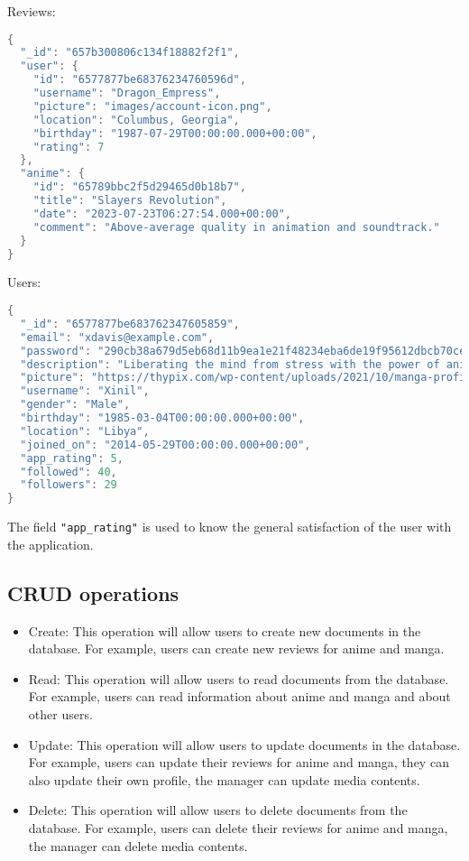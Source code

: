 \newpage
Reviews:
\begin{mdframed}[backgroundcolor=yellow!20, innerleftmargin=10pt, innerrightmargin=10pt]
    \begin{lstlisting}[language=java]
{
  "_id": "657b300806c134f18882f2f1",
  "user": {
    "id": "6577877be68376234760596d",
    "username": "Dragon_Empress",
    "picture": "images/account-icon.png",
    "location": "Columbus, Georgia",
    "birthday": "1987-07-29T00:00:00.000+00:00",
    "rating": 7
  },
  "anime": {
    "id": "65789bbc2f5d29465d0b18b7",
    "title": "Slayers Revolution",
    "date": "2023-07-23T06:27:54.000+00:00",
    "comment": "Above-average quality in animation and soundtrack."
  }
}
    \end{lstlisting}
\end{mdframed}

Users:
\begin{mdframed}[backgroundcolor=yellow!20, innerleftmargin=10pt, innerrightmargin=10pt]
    \begin{lstlisting}[language=java]
{
  "_id": "6577877be683762347605859",
  "email": "xdavis@example.com",
  "password": "290cb38a679d5eb68d11b9ea1e21f48234eba6de19f95612dbcb70ce0c7e4e78",
  "description": "Liberating the mind from stress with the power of anime zen.",
  "picture": "https://thypix.com/wp-content/uploads/2021/10/manga-profile-picture-44",
  "username": "Xinil",
  "gender": "Male",
  "birthday": "1985-03-04T00:00:00.000+00:00",
  "location": "Libya",
  "joined_on": "2014-05-29T00:00:00.000+00:00",
  "app_rating": 5,
  "followed": 40,
  "followers": 29
}
    \end{lstlisting}
\end{mdframed}


The field \texttt{"app\_rating"} is used to know the general satisfaction of the user with the application.

\newpage

\subsection {CRUD operations}
\begin{itemize}
    \item Create: This operation will allow users to create new documents in the database. For example, users can create new reviews for anime and manga.
    \item Read: This operation will allow users to read documents from the database. For example, users can read information about anime and manga and about other users.
    \item Update: This operation will allow users to update documents in the database. For example, users can update their reviews for anime and manga, they can also update their own profile, the manager can update media contents.
    \item Delete: This operation will allow users to delete documents from the database. For example, users can delete their reviews for anime and manga, the manager can delete media contents.
\end{itemize}

